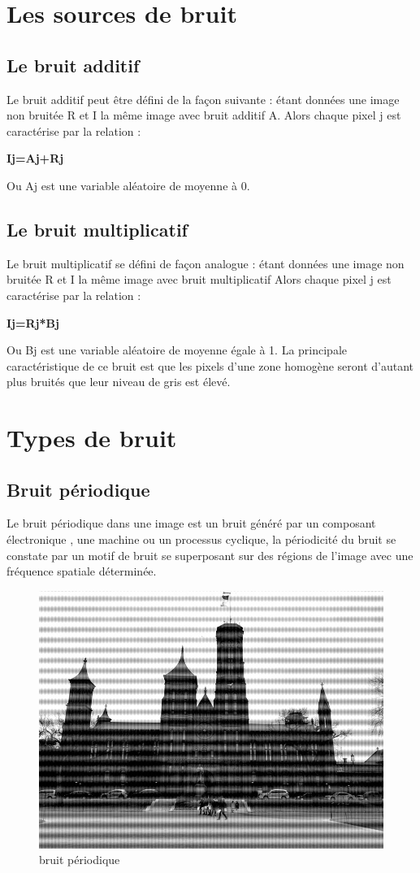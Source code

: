 \documentclass[12pt,a4paper]{report}
\numberwithin{equation}{subsection}
\numberwithin{equation}{section}
\begin{document}
\newpage
\section{Les sources de bruit}
\subsection{Le bruit additif}
Le bruit additif peut être défini de la façon suivante : étant données une image non bruitée R et I la même image avec bruit additif A.\newline
Alors chaque pixel j est caractérise par la relation : 

\begin{center}
    {\bfseries Ij=Aj+Rj}
\end{center}
\newline
\newline
 Ou Aj est une variable aléatoire de moyenne à 0.

\subsection{Le bruit multiplicatif}
Le bruit multiplicatif se défini de façon analogue : étant données une image non bruitée R et I la même image avec bruit multiplicatif Alors chaque pixel j est caractérise par la relation :\begin{center}
    {\bfseries Ij=Rj*Bj}
\end{center}
\newline
\newline Ou Bj est une variable aléatoire de moyenne égale à 1. La principale caractéristique de ce bruit est que les pixels d’une zone homogène seront d’autant plus bruités que leur niveau de gris est élevé.
\newpage
\section{Types de bruit}
\subsection{Bruit périodique}
Le bruit périodique dans une image est un bruit généré par un composant électronique , une machine ou un processus cyclique, la périodicité du bruit se constate par un motif de bruit se superposant sur des régions de l’image avec une fréquence spatiale déterminée.
\begin{figure}[h!]
    \centering
    \includegraphics[width=.3\textwidth]{periodique.jpg}
     \caption{bruit périodique}
\end{figure}
\end{document}
